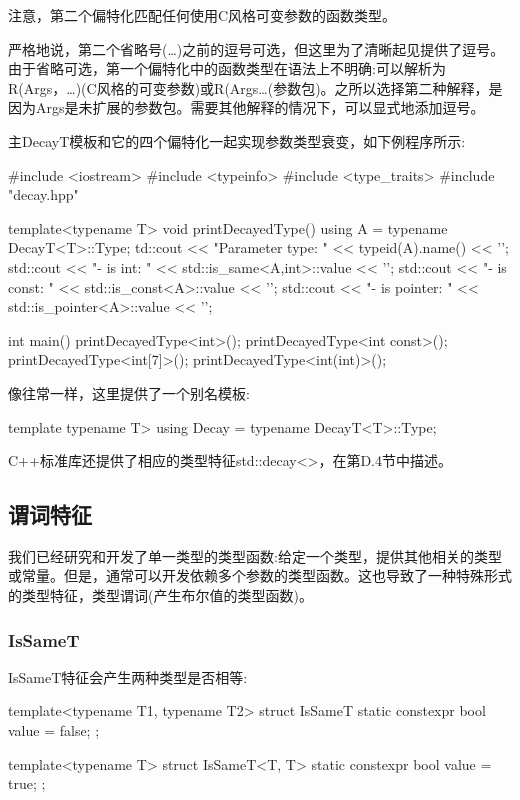 注意，第二个偏特化匹配任何使用C风格可变参数的函数类型。

\begin{notice}
严格地说，第二个省略号(…)之前的逗号可选，但这里为了清晰起见提供了逗号。由于省略可选，第一个偏特化中的函数类型在语法上不明确:可以解析为R(Args，…)(C风格的可变参数)或R(Args…(参数包)。之所以选择第二种解释，是因为Args是未扩展的参数包。需要其他解释的情况下，可以显式地添加逗号。
\end{notice}

主DecayT模板和它的四个偏特化一起实现参数类型衰变，如下例程序所示:

\begin{cpp}
#include <iostream>
#include <typeinfo>
#include <type_traits>
#include "decay.hpp"

template<typename T>
void printDecayedType()
{
	using A = typename DecayT<T>::Type;
	td::cout << "Parameter type: " << typeid(A).name() << '\n';
	std::cout << "- is int: " << std::is_same<A,int>::value << '\n';
	std::cout << "- is const: " << std::is_const<A>::value << '\n';
	std::cout << "- is pointer: " << std::is_pointer<A>::value << '\n';
}

int main()
{
	printDecayedType<int>();
	printDecayedType<int const>();
	printDecayedType<int[7]>();
	printDecayedType<int(int)>();
}
\end{cpp}

像往常一样，这里提供了一个别名模板:

\begin{cpp}
template typename T>
using Decay = typename DecayT<T>::Type;
\end{cpp}

C++标准库还提供了相应的类型特征std::decay<>，在第D.4节中描述。

\subsection{谓词特征}

我们已经研究和开发了单一类型的类型函数:给定一个类型，提供其他相关的类型或常量。但是，通常可以开发依赖多个参数的类型函数。这也导致了一种特殊形式的类型特征，类型谓词(产生布尔值的类型函数)。

\subsubsection{IsSameT}

IsSameT特征会产生两种类型是否相等:

\begin{cpp}
template<typename T1, typename T2>
struct IsSameT {
	static constexpr bool value = false;
};

template<typename T>
struct IsSameT<T, T> {
	static constexpr bool value = true;
};
\end{cpp}

